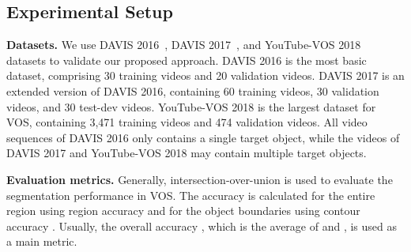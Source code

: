 \documentclass[10pt,twocolumn,letterpaper]{article}
\begin{document}
	\subsection{Experimental Setup}
	\label{setup}
	\noindent\textbf{Datasets.} We use DAVIS 2016~\cite{DAVIS2016}, DAVIS 2017~\cite{DAVIS2017}, and YouTube-VOS 2018~\cite{YTVOS} datasets to validate our proposed approach. DAVIS 2016 is the most basic dataset, comprising 30 training videos and 20 validation videos. DAVIS 2017 is an extended version of DAVIS 2016, containing 60 training videos, 30 validation videos, and 30 test-dev videos. YouTube-VOS 2018 is the largest dataset for VOS, containing 3,471 training videos and 474 validation videos. All video sequences of DAVIS 2016 only contains a single target object, while the videos of DAVIS 2017 and YouTube-VOS 2018 may contain multiple target objects.
	
	\vspace{1mm}
	\noindent\textbf{Evaluation metrics.} Generally, intersection-over-union is used to evaluate the segmentation performance in VOS. The accuracy is calculated for the entire region using region accuracy  and for the object boundaries using contour accuracy . Usually, the overall accuracy , which is the average of  and , is used as a main metric. 
	
	
	
\end{document}
